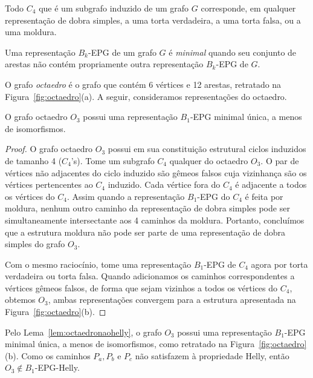 \begin{lema}\label{lem:representacaoC4}
\cite{golumbic2009} Todo $C_4$ que é um subgrafo induzido de um grafo $ G $ corresponde, em qualquer representação de dobra simples, a uma torta verdadeira, a uma torta falsa, ou a uma moldura.
\end{lema}

\begin{definition}
Uma representação $B_k$-EPG de um grafo $G$ é \emph{minimal} quando seu conjunto de arestas não contém propriamente outra representação $B_k$-EPG de $G$.
\end{definition}

O grafo \textit{octaedro} é o grafo que contém  6 vértices e 12 arestas, retratado na  Figura~\ref{fig:octaedro}(a). A seguir, consideramos  representações do octaedro.

\begin{lema}\label{lem:octaedronaohelly}
O grafo octaedro  $O_3$ possui uma representação $ B_1$-EPG minimal única, a menos de isomorfismos.
\end{lema}
\begin{proof}
O grafo octaedro $ O_3 $ possui em sua constituição estrutural ciclos induzidos de tamanho  4 ($ C_4$'s). 
Tome um subgrafo $ C_4 $ qualquer do octaedro $ O_3$. O par de vértices não adjacentes do ciclo induzido são gêmeos falsos cuja vizinhança são os vértices pertencentes ao $C_4$ induzido. Cada vértice fora do $C_4$ é adjacente a todos os vértices do $C_4$. Assim quando a representação $ B_1$-EPG do $C_4$ é feita por  moldura, nenhum outro caminho da representação de dobra simples pode ser simultaneamente intersectante aos 4 caminhos da moldura. Portanto, concluímos que a estrutura moldura não pode ser parte de uma representação de dobra simples do grafo $ O_3$.

Com o mesmo raciocínio, tome uma representação $ B_1$-EPG de $C_4$ agora por torta verdadeira ou torta falsa. Quando adicionamos os caminhos correspondentes a vértices gêmeos falsos, de forma que sejam vizinhos a todos os vértices do $ C_4 $, obtemos $ O_3$, ambas representações convergem para a estrutura apresentada na Figura~\ref{fig:octaedro}(b). 
 \end{proof}

 

Pelo Lema~\ref{lem:octaedronaohelly}, o grafo $ O_3 $ possui uma representação  $B_1$-EPG minimal única, a menos de isomorfismos, como retratado na Figura~\ref{fig:octaedro}(b). Como os caminhos $ P_a, P_b $ e $ P_c $  não satisfazem à propriedade Helly, então $O_3 \notin B_1$-EPG-Helly. 


